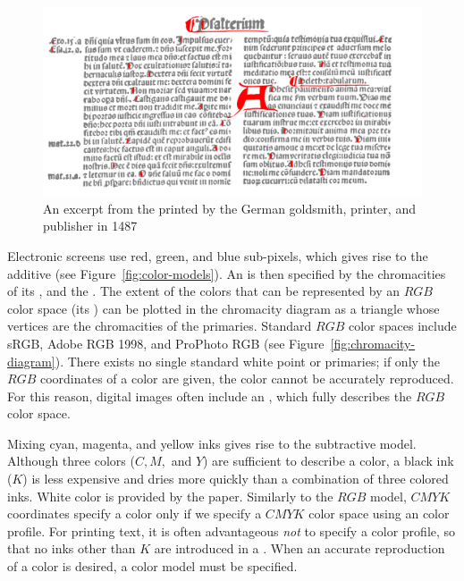 \begin{figure}
  \includegraphics[width=\textwidth]{examples/03/1500-latin-vulgate}
  \caption{An excerpt from the  printed by
    the German goldsmith, printer, and publisher  in
    1487}
  \label{fig:vulgate-bible}
\end{figure}

Electronic screens use red, green, and blue sub-pixels, which gives rise to the
additive 
(see Figure~\ref{fig:color-models}). An  is then specified by the chromacities of its
, and the . The extent of the
colors that can be represented by an $RGB$ color space (its ) can
be plotted in the chromacity diagram as a triangle whose vertices are the
chromacities of the primaries. Standard $RGB$ color spaces include sRGB, Adobe
RGB 1998, and ProPhoto RGB (see
Figure~\ref{fig:chromacity-diagram}).
There exists no single standard white point or primaries; if only the $RGB$
coordinates of a color are given, the color cannot be accurately reproduced.
For this reason, digital images often include an  , which fully describes the $RGB$ color space.

Mixing cyan, magenta, and yellow inks gives rise to the subtractive
 model. Although three colors ($C,
M,$ and $Y$) are sufficient to describe a color, a black ink ($K$) is less
expensive and dries more quickly than a combination of three colored inks.
White color is provided by the paper. Similarly to the $RGB$ model, $CMYK$
coordinates specify a color only if we specify a $CMYK$ color space using an  color profile. For printing text, it is
often advantageous \emph{not} to specify a color profile, so that no inks other
than $K$ are introduced in a . When an accurate
reproduction of a color is desired, a color model must be specified.

